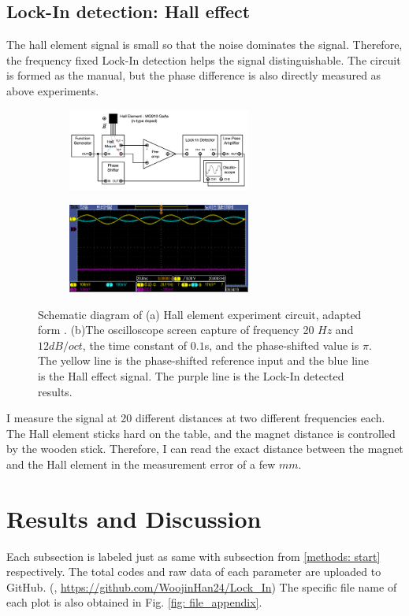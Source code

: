 \documentclass{article}
\begin{document}
 \subsection{Lock-In detection: Hall effect}
 The hall element signal is small so that the noise dominates the signal.
 Therefore, the frequency fixed Lock-In detection helps the signal distinguishable.
 The circuit is formed as the manual, but the phase difference is also directly measured as above experiments.
 \begin{figure}[ht]
    \centering
    \begin{subfigure}[b]{6cm}
        \centering
        \includegraphics[width=6cm]{../results/hall_sensor_circuit.png}
        \caption{}
    \end{subfigure}
    \hfill
    \begin{subfigure}[b]{6cm}
        \centering
        \includegraphics[width=6cm]{../raw_data/TEK00697.PNG}
        \caption{}
    \end{subfigure}
    \hfill
    \caption{Schematic diagram of (a) Hall element experiment circuit, adapted form  \cite{manual}.
    (b)The oscilloscope screen capture of frequency 20 $Hz$ and $12 dB/oct$, the time constant of $0.1$s, and the phase-shifted value is $\pi$.
    The yellow line is the phase-shifted reference input and the blue line is the Hall effect signal.
    The purple line is the Lock-In detected results.
    }
    \label{fig: hall_element_circuit}
  \end{figure}
 
 I measure the signal at 20 different distances at two different frequencies each.
 The Hall element sticks hard on the table, and the magnet distance is controlled by the wooden stick.
 Therefore, I can read the exact distance between the magnet and the Hall element in the measurement error of a few $mm$.

\section{Results and Discussion}
\label{results: start}
 Each subsection is labeled just as same with subsection from \ref{methods: start} respectively.
 The total codes and raw data of each parameter are uploaded to GitHub.
 (\cite{github}, \url{https://github.com/WoojinHan24/Lock_In})
 The specific file name of each plot is also obtained in Fig. \ref{fig: file_appendix}.
\end{document}
